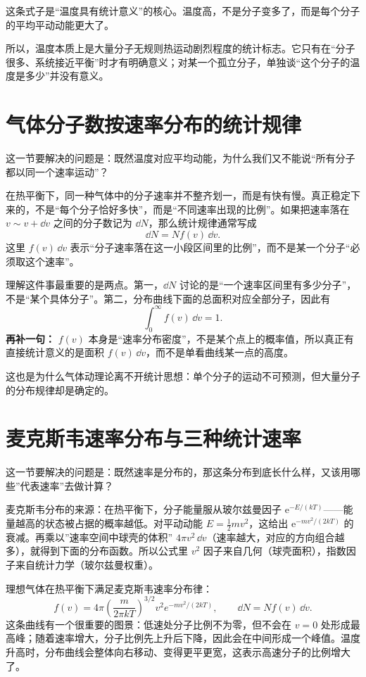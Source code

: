 \documentclass[lang=cn,11pt]{elegantbook}
\newcommand{\bridge}[1]{\begin{note}#1\end{note}}
\begin{document}
\bridge{这条式子是“温度具有统计意义”的核心。温度高，不是分子变多了，而是每个分子的平均平动动能更大了。}

所以，温度本质上是大量分子无规则热运动剧烈程度的统计标志。它只有在“分子很多、系统接近平衡”时才有明确意义；对某一个孤立分子，单独谈“这个分子的温度是多少”并没有意义。

\section{气体分子数按速率分布的统计规律}

这一节要解决的问题是：既然温度对应平均动能，为什么我们又不能说“所有分子都以同一个速率运动”？

在热平衡下，同一种气体中的分子速率并不整齐划一，而是有快有慢。真正稳定下来的，不是“每个分子恰好多快”，而是“不同速率出现的比例”。如果把速率落在 \(v\sim v+\dd v\) 之间的分子数记为 \(\dd N\)，那么统计规律通常写成
\[
\dd N=Nf(v)\,\dd v.
\]
这里 \(f(v)\,\dd v\) 表示“分子速率落在这一小段区间里的比例”，而不是某一个分子“必须取这个速率”。

\begin{note}
理解这件事最重要的是两点。第一，\(\dd N\) 讨论的是“一个速率区间里有多少分子”，不是“某个具体分子”。第二，分布曲线下面的总面积对应全部分子，因此有
\[
\int_0^{\infty} f(v)\,\dd v=1.
\]
\textbf{再补一句：} \(f(v)\) 本身是“速率分布密度”，不是某个点上的概率值，所以真正有直接统计意义的是面积 \(f(v)\,\dd v\)，而不是单看曲线某一点的高度。
\end{note}

这也是为什么气体动理论离不开统计思想：单个分子的运动不可预测，但大量分子的分布规律却是确定的。

\section{麦克斯韦速率分布与三种统计速率}

这一节要解决的问题是：既然速率是分布的，那这条分布到底长什么样，又该用哪些”代表速率”去做计算？

\bridge{麦克斯韦分布的来源：在热平衡下，分子能量服从玻尔兹曼因子 \(\mathrm{e}^{-E/(kT)}\)——能量越高的状态被占据的概率越低。对平动动能 \(E=\frac12 mv^2\)，这给出 \(\mathrm{e}^{-mv^2/(2kT)}\) 的衰减。再乘以”速率空间中球壳的体积” \(4\pi v^2\,\dd v\)（速率越大，对应的方向组合越多），就得到下面的分布函数。所以公式里 \(v^2\) 因子来自几何（球壳面积），指数因子来自统计力学（玻尔兹曼权重）。}

理想气体在热平衡下满足麦克斯韦速率分布律：
\[
f(v)=4\pi\left(\frac{m}{2\pi kT}\right)^{3/2}v^2 e^{-mv^2/(2kT)},
\qquad \dd N=Nf(v)\,\dd v.
\]
这条曲线有一个很重要的图景：低速处分子比例不为零，但不会在 \(v=0\) 处形成最高峰；随着速率增大，分子比例先上升后下降，因此会在中间形成一个峰值。温度升高时，分布曲线会整体向右移动、变得更平更宽，这表示高速分子的比例增大了。
\end{document}
